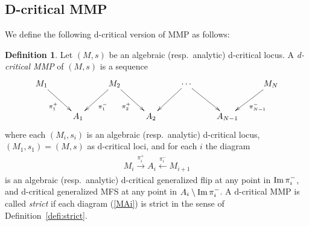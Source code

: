 \documentclass[11pt]{amsart}
\theoremstyle{plain}
\theoremstyle{definition}
\newtheorem{defi}[thm]{Definition}
\theoremstyle{remark}
\newcommand{\Imm}{\mathop{\rm Im}\nolimits}
\begin{document}
\subsection{D-critical MMP}
We define the following d-critical version of MMP as follows:
\begin{defi}\label{def:d-mmp}
Let $(M, s)$ be an algebraic (resp.~analytic) d-critical 
locus. A \textit{d-critical MMP} of $(M, s)$ is a sequence
\begin{align}\label{d-MMP}
\xymatrix{
M_1 \ar[rd]_-{\pi_1^+}  &  &  M_2 \ar[ld]^-{\pi_1^-} \ar[rd]_-{\pi_2^+} &  & \cdots \ar[ld] \ar[rd] &
  &  M_{N} \ar[ld]^-{\pi_{N-1}^-}
\\
& A_1  & & A_2 & & A_{N-1}  &
}
\end{align} 
where each $(M_i, s_i)$ is an algebraic (resp.~analytic) d-critical locus, 
$(M_1, s_1)=(M, s)$ as d-critical loci, and for each $i$
the diagram
\begin{align}\label{MAi}
M_i \stackrel{\pi_i^+}{\to} A_i 
\stackrel{\pi_i^-}{\leftarrow} M_{i+1}
\end{align}
 is an algebraic
 (resp.~analytic) d-critical generalized
flip
at any point in $\Imm \pi_i^-$, and
d-critical generalized MFS 
at any point in $A_i \setminus \Imm \pi_i^-$. 
A d-critical MMP is called \textit{strict} if 
each diagram (\ref{MAi})
is strict 
in the sense of Definition~\ref{defi:strict}. 
\end{defi}
\end{document}
